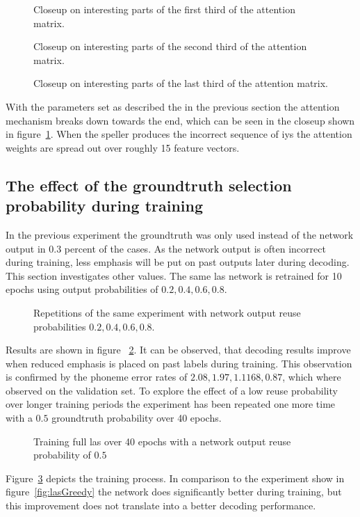 \begin{figure}
\centering

\caption{Closeup on interesting parts of the first third of the attention matrix.}

\caption{Closeup on interesting parts of the second third of the attention matrix.}

\caption{Closeup on interesting parts of the last third of the attention matrix.}
\label{fig:attention3}
\end{figure}
With the parameters set as described the in the previous section the attention mechanism breaks down towards the end, which can be seen in the closeup shown in figure~\ref{fig:attention3}. When the speller produces the incorrect sequence of iys the attention weights are spread out over roughly 15 feature vectors. 


\subsection{The effect of the groundtruth selection probability during training}
In the previous experiment the groundtruth was only used instead of the network output in 0.3 percent of the cases. As the network output is often incorrect during training, less emphasis will be put on past outputs later during decoding. This section investigates
other values. The same las network is retrained for 10 epochs using output probabilities of $0.2,0.4,0.6,0.8$.
\begin{figure}




\caption{Repetitions of the same experiment with network output reuse probabilities $0.2, 0.4, 0.6, 0.8$. }
\label{fig:lasGreedy2468}
\end{figure}
Results are shown in figure ~\ref{fig:lasGreedy2468}. It can be observed, that decoding results improve when reduced emphasis is placed on past labels during training. This observation is confirmed by the phoneme error rates of $2.08, 1.97, 1.1168, 0.87$, which where observed on the validation set.
To explore the effect of a low reuse probability over longer training periods the experiment has been repeated one more time with a $0.5$ groundtruth probability over 40 epochs.
\begin{figure}


\caption{Training full las over 40 epochs with a network output reuse probability of $0.5$}
\label{fig:lasGreedy05}
\end{figure}
Figure~\ref{fig:lasGreedy05} depicts the training process. In comparison to the experiment show in figure~\ref{fig:lasGreedy} the network does significantly better during training, but
this improvement does not translate into a better decoding performance.

